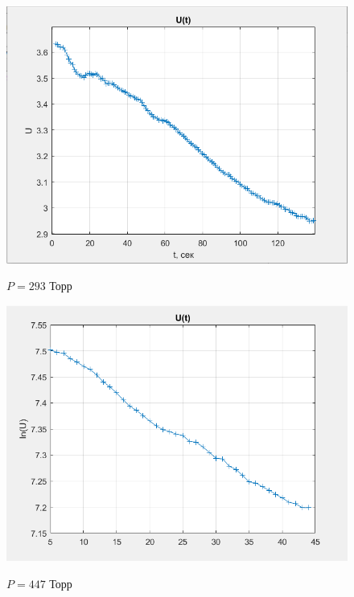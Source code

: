 \documentclass[a4paper, 12pt]{article} %
\begin{document}
\begin{figure}[h]
    \centering
    \includegraphics[width = 10.5 cm]{1gr293}
    \label{fig:vac}
    
    \begin{center}
        \caption{$P = 293$ Торр}
    \end{center}
\end{figure} 

\begin{figure}[h]
    \centering
    \includegraphics[width = 10.5 cm]{1gr447}
    \label{fig:vac}
    
    \begin{center}
        \caption{$P = 447$ Торр}
    \end{center}
\end{figure} 
\end{document}
